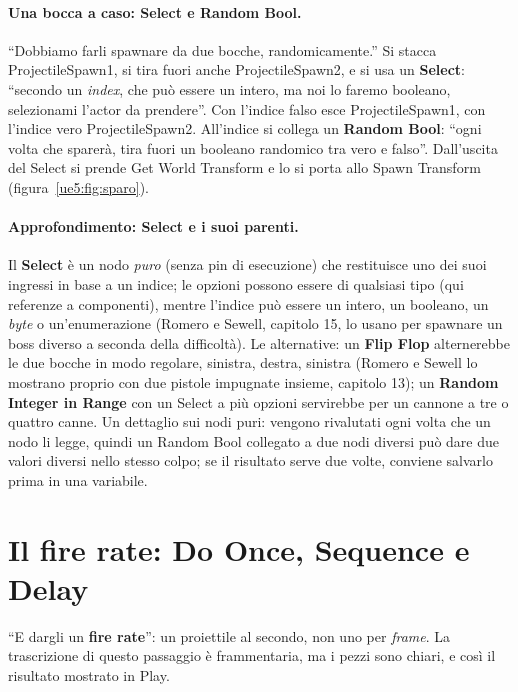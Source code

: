 \paragraph{Una bocca a caso: Select e Random Bool.} ``Dobbiamo farli spawnare da due
bocche, randomicamente.'' Si stacca ProjectileSpawn1, si tira fuori anche
ProjectileSpawn2, e si usa un \textbf{Select}: ``secondo un \emph{index}, che può essere
un intero, ma noi lo faremo booleano, selezionami l'actor da prendere''. Con l'indice
falso esce ProjectileSpawn1, con l'indice vero ProjectileSpawn2. All'indice si collega un
\textbf{Random Bool}: ``ogni volta che sparerà, tira fuori un booleano randomico tra vero
e falso''. Dall'uscita del Select si prende Get World Transform e lo si porta allo Spawn
Transform (figura~\ref{ue5:fig:sparo}).

\paragraph{Approfondimento: Select e i suoi parenti.} Il \textbf{Select} è un nodo
\emph{puro} (senza pin di esecuzione) che restituisce uno dei suoi ingressi in base a
un indice; le opzioni possono essere di qualsiasi tipo (qui referenze a componenti),
mentre l'indice può essere un intero, un booleano, un \emph{byte} o un'enumerazione
(Romero e Sewell, capitolo 15, lo usano per spawnare un boss diverso a seconda della
difficoltà). Le alternative: un \textbf{Flip Flop} alternerebbe le due bocche in modo
regolare, sinistra, destra, sinistra (Romero e Sewell lo mostrano proprio con due
pistole impugnate insieme, capitolo 13); un \textbf{Random Integer in Range} con un
Select a più opzioni servirebbe per un cannone a tre o quattro canne. Un dettaglio sui
nodi puri: vengono rivalutati ogni volta che un nodo li legge, quindi un Random Bool
collegato a due nodi diversi può dare due valori diversi nello stesso colpo; se il
risultato serve due volte, conviene salvarlo prima in una variabile.

\section{Il fire rate: Do Once, Sequence e Delay}
\label{ue5:sec:firerate}

``E dargli un \textbf{fire rate}'': un proiettile al secondo, non uno per \emph{frame}.
La trascrizione di questo passaggio è frammentaria, ma i pezzi sono chiari, e così il
risultato mostrato in Play.

